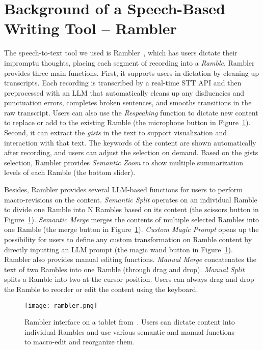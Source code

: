 \section{Background of a Speech-Based Writing Tool -- Rambler}

The speech-to-text tool we used is Rambler~\cite{lin2024rambler}, which has users dictate their impromptu thoughts, placing each segment of recording into a \textit{Ramble}. Rambler provides three main functions. First, it supports users in dictation by cleaning up transcripts. Each recording is transcribed by a real-time STT API and then preprocessed with an LLM that automatically cleans up any disfluencies and punctuation errors, completes broken sentences, and smooths transitions in the raw transcript. Users can also use the \textit{Respeaking} function to dictate new content to replace or add to the existing Ramble (the microphone button in Figure~\ref{fig:rambler}). Second, it can extract the \textit{gists} in the text to support visualization and interaction with that text. The keywords of the content are shown automatically after recording, and users can adjust the selection on demand. Based on the gists selection, Rambler provides \textit{Semantic Zoom} to show multiple summarization levels of each Ramble (the bottom slider).

Besides, Rambler provides several LLM-based functions for users to perform macro-revisions on the content. \textit{Semantic Split} operates on an individual Ramble to divide one Ramble into N Rambles based on its content (the scissors button in Figure~\ref{fig:rambler}). \textit{Semantic Merge} merges the contents of multiple selected Rambles into one Ramble (the merge button in Figure~\ref{fig:rambler}). \textit{Custom Magic Prompt} opens up the possibility for users to define any custom transformation on Ramble content by directly inputting an LLM prompt (the magic wand button in Figure~\ref{fig:rambler}). Rambler also provides manual editing functions. \textit{Manual Merge} concatenates the text of two Rambles into one Ramble (through drag and drop). \textit{Manual Split} splits a Ramble into two at the cursor position. Users can always drag and drop the Ramble to reorder or edit the content using the keyboard. 

\begin{figure}
  \centering
  \texttt{[image: rambler.png]}
  \caption{Rambler interface on a tablet from~\cite{lin2024rambler}. Users can dictate content into individual Rambles and use various semantic and manual functions to macro-edit and reorganize them.}
  \label{fig:rambler}
\end{figure}


